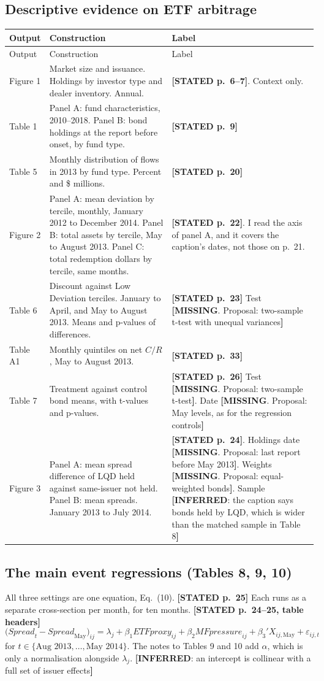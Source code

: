 \documentclass[10pt,a4paper]{article}
\newcommand{\ST}[1]{\textcolor{cst}{\textbf{[STATED #1]}}}
\newcommand{\IN}[1]{\textcolor{cin}{\textbf{[INFERRED}: #1\textbf{]}}}
\newcommand{\MI}[1]{\textcolor{cmi}{\textbf{[MISSING}. Proposal: #1\textbf{]}}}
\newcommand{\Spread}{\mathit{Spread}}
\begin{document}
\subsection{Descriptive evidence on ETF arbitrage}
\begin{longtable}{@{}P{2.3cm}P{9.2cm}P{5.5cm}@{}}
\toprule
Output & Construction & Label\\
\midrule\endfirsthead
\toprule Output & Construction & Label\\ \midrule\endhead
Figure 1 & Market size and issuance. Holdings by investor type and dealer inventory. Annual. & \ST{p.~6--7}. Context only.\\
Table 1 & Panel A: fund characteristics, 2010--2018. Panel B: bond holdings at the report before onset, by fund type. & \ST{p.~9}\\
Table 5 & Monthly distribution of flows in 2013 by fund type. Percent and \$ millions. & \ST{p.~20}\\
Figure 2 & Panel A: mean deviation by tercile, monthly, January 2012 to December 2014. Panel B: total assets by tercile, May to August 2013. Panel C: total redemption dollars by tercile, same months. & \ST{p.~22}. I read the axis of panel A, and it covers the caption's dates, not those on p.~21.\\
Table 6 & Discount against Low Deviation terciles. January to April, and May to August 2013. Means and p-values of differences. & \ST{p.~23} Test \MI{two-sample t-test with unequal variances}\\
Table A1 & Monthly quintiles on net $C/R$, May to August 2013. & \ST{p.~33}\\
Table 7 & Treatment against control bond means, with t-values and p-values. & \ST{p.~26} Test \MI{two-sample t-test}. Date \MI{May levels, as for the regression controls}\\
Figure 3 & Panel A: mean spread difference of LQD held against same-issuer not held. Panel B: mean spreads. January 2013 to July 2014. & \ST{p.~24}. Holdings date \MI{last report before May 2013}. Weights \MI{equal-weighted bonds}. Sample \IN{the caption says bonds held by LQD, which is wider than the matched sample in Table 8}\\
\bottomrule
\end{longtable}

\subsection{The main event regressions (Tables 8, 9, 10)}
All three settings are one equation, Eq.~(10). \ST{p.~25} Each runs as a separate cross-section per month, for ten months. \ST{p.~24--25, table headers}
\begin{equation}\label{eq:main}
\bigl(\Spread_t-\Spread_{\text{May}}\bigr)_{ij}=\lambda_j+\beta_1\mathit{ETFproxy}_{ij}+\beta_2\mathit{MFpressure}_{ij}+\beta_3' X_{ij,\text{May}}+\varepsilon_{ij,t}
\end{equation}
for $t\in\{\text{Aug 2013},\dots,\text{May 2014}\}$. The notes to Tables 9 and 10 add $\alpha$, which is only a normalisation alongside $\lambda_j$. \IN{an intercept is collinear with a full set of issuer effects}
\end{document}
